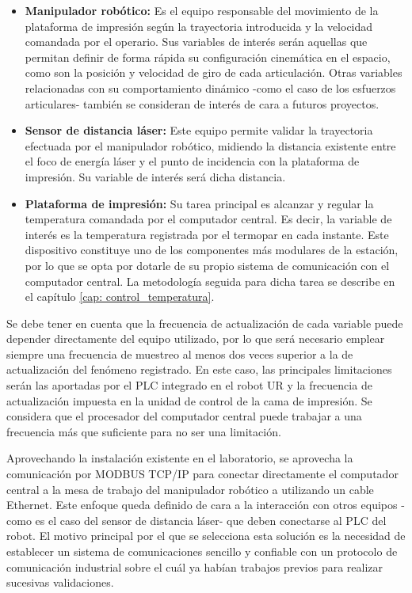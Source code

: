 \begin{itemize}
    \item \textbf{Manipulador robótico:} Es el equipo responsable del movimiento de la plataforma de impresión según la trayectoria introducida y la velocidad comandada por el operario. Sus variables de interés serán aquellas que permitan definir de forma rápida su configuración cinemática en el espacio, como son la posición y velocidad de giro de cada articulación. Otras variables relacionadas con su comportamiento dinámico -como el caso de los esfuerzos articulares- también se consideran de interés de cara a futuros proyectos.
    \item \textbf{Sensor de distancia láser:} Este equipo permite validar la trayectoria efectuada por el manipulador robótico, midiendo la distancia existente entre el foco de energía láser y el punto de incidencia con la plataforma de impresión. Su variable de interés será dicha distancia.
    \item \textbf{Plataforma de impresión:} Su tarea principal es alcanzar y regular la temperatura comandada por el computador central. Es decir, la variable de interés es la temperatura registrada por el termopar en cada instante. Este dispositivo constituye uno de los componentes más modulares de la estación, por lo que se opta por dotarle de su propio sistema de comunicación con el computador central. La metodología seguida para dicha tarea se describe en el capítulo \ref{cap: control_temperatura}.
\end{itemize}

Se debe tener en cuenta que la frecuencia de actualización de cada variable puede depender directamente del equipo utilizado, por lo que será necesario emplear siempre una frecuencia de muestreo al menos dos veces superior a la de actualización del fenómeno registrado. En este caso, las principales limitaciones serán las aportadas por el \acrshort{PLC} integrado en el robot UR y la frecuencia de actualización impuesta en la unidad de control de la cama de impresión. Se considera que el procesador del computador central puede trabajar a una frecuencia más que suficiente para no ser una limitación.

Aprovechando la instalación existente en el laboratorio, se aprovecha la comunicación por MODBUS \acrshort{TCP/IP} para conectar directamente el computador central a la mesa de trabajo del manipulador robótico a utilizando un cable Ethernet. Este enfoque queda definido de cara a la interacción con otros equipos -como es el caso del sensor de distancia láser- que deben conectarse al \acrshort{PLC} del robot. El motivo principal por el que se selecciona esta solución es la necesidad de establecer un sistema de comunicaciones sencillo y confiable con un protocolo de comunicación industrial sobre el cuál ya habían trabajos previos para realizar sucesivas validaciones. 

